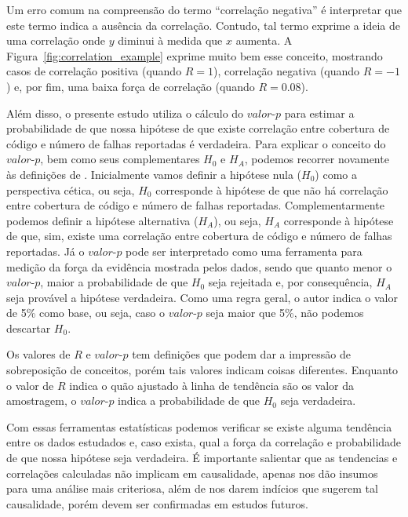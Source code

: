 \documentclass[11.5pt]{article}
\begin{document}
Um erro comum na compreensão do termo ``correlação negativa'' é interpretar que este termo indica a
ausência da correlação.
Contudo, tal termo exprime a ideia de uma correlação onde $y$ diminui à medida que $x$ aumenta.
A Figura~\ref{fig:correlation_example} exprime muito bem esse conceito, mostrando casos de
correlação positiva (quando $R = 1$), correlação negativa (quando $R = -1$) e, por fim, uma baixa
força de correlação (quando $R = 0.08$).

Além disso, o presente estudo utiliza o cálculo do $valor\mbox{-}p$ para estimar a probabilidade de que
nossa hipótese de que existe correlação entre cobertura de código e número de falhas reportadas é
verdadeira.
Para explicar o conceito do $valor\mbox{-}p$, bem como seus complementares $H_0$ e $H_A$, podemos recorrer
novamente às definições de \cite{openIntroStat}.
Inicialmente vamos definir a hipótese nula ($H_0$) como a perspectiva cética, ou seja, $H_0$
corresponde à hipótese de que não há correlação entre cobertura de código e número de falhas
reportadas.
Complementarmente podemos definir a hipótese alternativa ($H_A$), ou seja, $H_A$ corresponde à
hipótese de que, sim, existe uma correlação entre cobertura de código e número de falhas reportadas.
Já o $valor\mbox{-}p$ pode ser interpretado como uma ferramenta para medição da força da evidência
mostrada pelos dados, sendo que quanto menor o $valor\mbox{-}p$, maior a probabilidade de que $H_0$
seja rejeitada e, por consequência, $H_A$ seja provável a hipótese verdadeira.
Como uma regra geral, o autor indica o valor de 5\% como base, ou seja, caso o $valor\mbox{-}p$ seja
maior que 5\%, não podemos descartar $H_0$.

Os valores de $R$ e $valor\mbox{-}p$ tem definições que podem dar a impressão de sobreposição de
conceitos, porém tais valores indicam coisas diferentes.
Enquanto o valor de $R$ indica o quão ajustado à linha de tendência são os valor da amostragem,
o $valor\mbox{-}p$ indica a probabilidade de que $H_0$ seja verdadeira.

Com essas ferramentas estatísticas podemos verificar se existe alguma tendência entre os dados
estudados e, caso exista, qual a força da correlação e probabilidade de que nossa hipótese seja
verdadeira.
É importante salientar que as tendencias e correlações calculadas não implicam em causalidade,
apenas nos dão insumos para uma análise mais criteriosa, além de nos darem indícios que sugerem tal
causalidade, porém devem ser confirmadas em estudos futuros.

\end{document}
